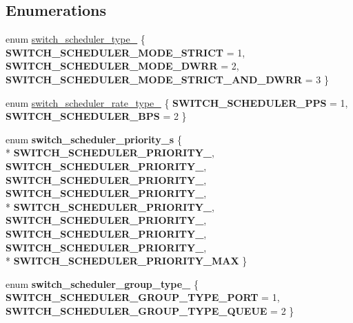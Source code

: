 \subsection*{Enumerations}
\begin{DoxyCompactItemize}
\item 
enum \hyperlink{group__Scheduler_gab958915b2985910d70073c1f50f1db2c}{switch\+\_\+scheduler\+\_\+type\+\_\+} \{ {\bfseries S\+W\+I\+T\+C\+H\+\_\+\+S\+C\+H\+E\+D\+U\+L\+E\+R\+\_\+\+M\+O\+D\+E\+\_\+\+S\+T\+R\+I\+C\+T} = 1, 
{\bfseries S\+W\+I\+T\+C\+H\+\_\+\+S\+C\+H\+E\+D\+U\+L\+E\+R\+\_\+\+M\+O\+D\+E\+\_\+\+D\+W\+R\+R} = 2, 
{\bfseries S\+W\+I\+T\+C\+H\+\_\+\+S\+C\+H\+E\+D\+U\+L\+E\+R\+\_\+\+M\+O\+D\+E\+\_\+\+S\+T\+R\+I\+C\+T\+\_\+\+A\+N\+D\+\_\+\+D\+W\+R\+R} = 3
 \}
\item 
enum \hyperlink{group__Scheduler_gabdcb6853f591a9102e7a108eb4d7b331}{switch\+\_\+scheduler\+\_\+rate\+\_\+type\+\_\+} \{ {\bfseries S\+W\+I\+T\+C\+H\+\_\+\+S\+C\+H\+E\+D\+U\+L\+E\+R\+\_\+\+P\+P\+S} = 1, 
{\bfseries S\+W\+I\+T\+C\+H\+\_\+\+S\+C\+H\+E\+D\+U\+L\+E\+R\+\_\+\+B\+P\+S} = 2
 \}
\item 
\hypertarget{group__Scheduler_ga89f275e617ac3bb04f08c0f5f4d9c70a}{enum {\bfseries switch\+\_\+scheduler\+\_\+priority\+\_\+s} \{ \\*
{\bfseries S\+W\+I\+T\+C\+H\+\_\+\+S\+C\+H\+E\+D\+U\+L\+E\+R\+\_\+\+P\+R\+I\+O\+R\+I\+T\+Y\+\_}, 
{\bfseries S\+W\+I\+T\+C\+H\+\_\+\+S\+C\+H\+E\+D\+U\+L\+E\+R\+\_\+\+P\+R\+I\+O\+R\+I\+T\+Y\+\_}, 
{\bfseries S\+W\+I\+T\+C\+H\+\_\+\+S\+C\+H\+E\+D\+U\+L\+E\+R\+\_\+\+P\+R\+I\+O\+R\+I\+T\+Y\+\_}, 
{\bfseries S\+W\+I\+T\+C\+H\+\_\+\+S\+C\+H\+E\+D\+U\+L\+E\+R\+\_\+\+P\+R\+I\+O\+R\+I\+T\+Y\+\_}, 
\\*
{\bfseries S\+W\+I\+T\+C\+H\+\_\+\+S\+C\+H\+E\+D\+U\+L\+E\+R\+\_\+\+P\+R\+I\+O\+R\+I\+T\+Y\+\_}, 
{\bfseries S\+W\+I\+T\+C\+H\+\_\+\+S\+C\+H\+E\+D\+U\+L\+E\+R\+\_\+\+P\+R\+I\+O\+R\+I\+T\+Y\+\_}, 
{\bfseries S\+W\+I\+T\+C\+H\+\_\+\+S\+C\+H\+E\+D\+U\+L\+E\+R\+\_\+\+P\+R\+I\+O\+R\+I\+T\+Y\+\_}, 
{\bfseries S\+W\+I\+T\+C\+H\+\_\+\+S\+C\+H\+E\+D\+U\+L\+E\+R\+\_\+\+P\+R\+I\+O\+R\+I\+T\+Y\+\_}, 
\\*
{\bfseries S\+W\+I\+T\+C\+H\+\_\+\+S\+C\+H\+E\+D\+U\+L\+E\+R\+\_\+\+P\+R\+I\+O\+R\+I\+T\+Y\+\_\+\+M\+A\+X}
 \}}\label{group__Scheduler_ga89f275e617ac3bb04f08c0f5f4d9c70a}

\item 
\hypertarget{group__Scheduler_gadc3ab56db7f3b3be0c0d1f9ea3f324eb}{enum {\bfseries switch\+\_\+scheduler\+\_\+group\+\_\+type\+\_\+} \{ {\bfseries S\+W\+I\+T\+C\+H\+\_\+\+S\+C\+H\+E\+D\+U\+L\+E\+R\+\_\+\+G\+R\+O\+U\+P\+\_\+\+T\+Y\+P\+E\+\_\+\+P\+O\+R\+T} = 1, 
{\bfseries S\+W\+I\+T\+C\+H\+\_\+\+S\+C\+H\+E\+D\+U\+L\+E\+R\+\_\+\+G\+R\+O\+U\+P\+\_\+\+T\+Y\+P\+E\+\_\+\+Q\+U\+E\+U\+E} = 2
 \}}\label{group__Scheduler_gadc3ab56db7f3b3be0c0d1f9ea3f324eb}

\end{DoxyCompactItemize}
